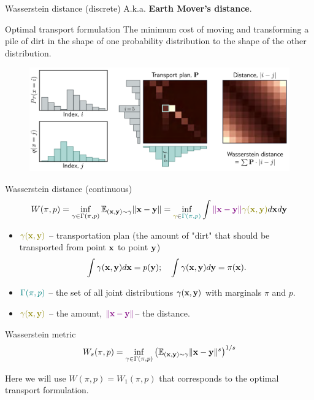 \begin{frame}{Wasserstein distance (discrete)}
	A.k.a. \textbf{Earth Mover's distance}.
	\begin{block}{Optimal transport formulation}
	The minimum cost of moving and transforming a pile of dirt in the shape of one probability distribution to the shape of the other distribution.
	\end{block}
	\begin{figure}
		\centering
		\includegraphics[width=\linewidth]{figs/discrete_wasserstein}
	\end{figure}
\end{frame}
\begin{frame}{Wasserstein distance (continuous)}
	\vspace{-0.7cm}
	\[
		W(\pi, p) = \inf_{\gamma \in \Gamma(\pi, p)} \bbE_{(\bx, \by) \sim \gamma} \| \bx - \by \| =  \inf_{{\color{olive}\gamma}\in {\color{teal}\Gamma(\pi, p)}} \int {\color{violet} \| \bx - \by \|} {\color{olive}\gamma (\bx, \by)} d \bx d \by
	\]
	\vspace{-0.4cm}
	\begin{itemize}
		\item ${\color{olive}\gamma (\bx, \by)}$ -- transportation plan (the amount of "dirt" that should be transported from point $\mathbf{x}$ to point $\mathbf{y}$)
		\vspace{-0.2cm}
		\[
			 \int \gamma(\mathbf{x}, \mathbf{y}) d \mathbf{x} = p(\mathbf{y}); \quad \int \gamma(\mathbf{x}, \mathbf{y}) d \mathbf{y} = \pi(\mathbf{x}).
		\]
		\vspace{-0.6cm}
		\item ${\color{teal}\Gamma(\pi, p)}$ -- the set of all joint distributions $\gamma (\mathbf{x}, \mathbf{y})$ with marginals $\pi$ and $p$.
		\item ${\color{olive}\gamma(\bx, \by)}$ -- the amount, ${\color{violet} \| \mathbf{x} - \mathbf{y} \|}$-- the distance.
	\end{itemize}
	\begin{block}{Wasserstein metric}
		\vspace{-0.2cm}
		\[
			W_s(\pi, p) = \inf_{\gamma \in \Gamma(\pi, p)} \left(\mathbb{E}_{(\mathbf{x}, \mathbf{y}) \sim \gamma} \| \mathbf{x} - \mathbf{y} \|^s\right)^{1/s}
		\]
		\vspace{-0.4cm}
	\end{block}
	Here we will use $W(\pi, p) = W_1(\pi, p)$ that corresponds to the optimal transport formulation.
\end{frame}
